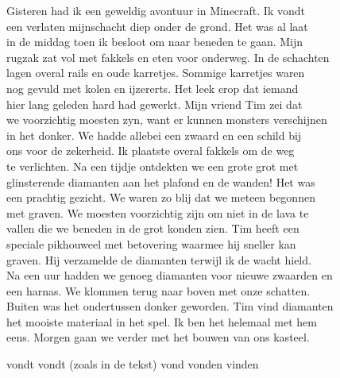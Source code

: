 \begin{opgave}

\begin{tekstmetfouten}
Gisteren had ik een geweldig avontuur in Minecraft. Ik vondt\\
een verlaten mijnschacht diep onder de grond. Het was al laat\\
in de middag toen ik besloot om naar beneden te gaan. Mijn\\
rugzak zat vol met fakkels en eten voor onderweg. In de schachten\\
lagen overal rails en oude karretjes. Sommige karretjes waren\\
nog gevuld met kolen en ijzererts. Het leek erop dat iemand\\
hier lang geleden hard had gewerkt. Mijn vriend Tim zei dat\\
we voorzichtig moesten zyn, want er kunnen monsters verschijnen\\
in het donker. We hadde allebei een zwaard en een schild bij\\
ons voor de zekerheid. Ik plaatste overal fakkels om de weg\\
te verlichten. Na een tijdje ontdekten we een grote grot met\\
glinsterende diamanten aan het plafond en de wanden! Het was\\
een prachtig gezicht. We waren zo blij dat we meteen begonnen\\
met graven. We moesten voorzichtig zijn om niet in de lava te\\
vallen die we beneden in de grot konden zien. Tim heeft een\\
speciale pikhouweel met betovering waarmee hij sneller kan\\
graven. Hij verzamelde de diamanten terwijl ik de wacht hield.\\
Na een uur hadden we genoeg diamanten voor nieuwe zwaarden en\\
een harnas. We klommen terug naar boven met onze schatten.\\
Buiten was het ondertussen donker geworden. Tim vind diamanten\\
het mooiste materiaal in het spel. Ik ben het helemaal met hem\\
eens. Morgen gaan we verder met het bouwen van ons kasteel.
\end{tekstmetfouten}

\begin{vragen}
%
{vondt}%
{vondt (zoals in de tekst)}%
{vond}%
{vonden}%
{vinden}


\end{vragen}
\end{opgave}
